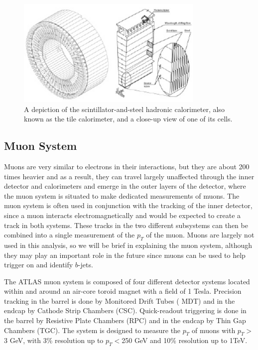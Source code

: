 \begin{figure}
	\includegraphics[width=0.8\textwidth]{ATLASDetector/images/tile_cal.pdf}
	\caption{A depiction of the scintillator-and-steel hadronic calorimeter, also known as the tile calorimeter, and a close-up view of one of its cells.	\label{fig:tile_cal}}
\end{figure}



\subsection{Muon System}
\label{sec:ms}
Muons are very similar to electrons in their interactions, but they are about 200 times heavier and as a 
result, they can travel largely unaffected through the inner detector and calorimeters and emerge in the outer layers of 
the detector, where the muon system is situated to make dedicated measurements of muons.  The muon system is 
often used in conjunction with the tracking of the inner detector, since a muon interacts electromagnetically and would be 
expected to create a track in both systems.  These tracks in the two different subsystems can then be combined 
into a single measurement of the $p_T$ of the muon.  Muons are largely not used 
in this analysis, so we will be brief in explaining the muon system, although they may play an 
important role in the future since muons can be used to help trigger on and identify $b$-jets.


The ATLAS muon system is composed of four different detector systems located within and around an air-core toroid 
magnet with a field of 1 Tesla.  Precision tracking in the barrel is done by Monitored Drift Tubes (
MDT) and in the endcap by Cathode Strip Chambers (CSC).  Quick-readout triggering is done in 
the barrel by Resistive Plate Chambers (RPC) and in the endcap by Thin Gap Chambers (TGC).   
The system is designed to measure the $p_T$ of muons with $p_T>$
3 GeV, with 3\% resolution up to $p_T<$250 GeV and 10\% resolution up to 1TeV.  



